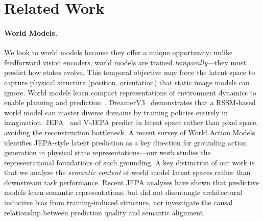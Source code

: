 \documentclass{article}
\begin{document}
\section{Related Work}
\label{sec:related}

\paragraph{World Models.}
We look to world models because they offer a unique opportunity:
unlike feedforward vision encoders, world models are trained
\emph{temporally}---they must predict how states evolve.
This temporal objective may force the latent space to capture
physical structure (position, orientation) that static
image models can ignore.
World models learn compact representations of environment dynamics
to enable planning and prediction~\cite{hafner2023dreamerv3}.
DreamerV3~\cite{hafner2023dreamerv3} demonstrates that a RSSM-based world
model can master diverse domains by training policies entirely in imagination.
JEPA~\cite{assran2023ijepa} and V-JEPA predict in latent space rather than
pixel space, avoiding the reconstruction bottleneck.
A recent survey of World Action Models~\cite{wang2025wam} identifies
JEPA-style latent prediction as a key direction for grounding action generation
in physical state representations---our work studies the representational
foundations of such grounding.
A key distinction of our work is that we analyze the \emph{semantic content}
of world model latent spaces rather than downstream task performance.
Recent JEPA analyses have shown that predictive models learn semantic representations,
but did not disentangle architectural inductive bias from training-induced structure,
nor investigate the causal relationship between prediction quality and semantic alignment.
\end{document}
